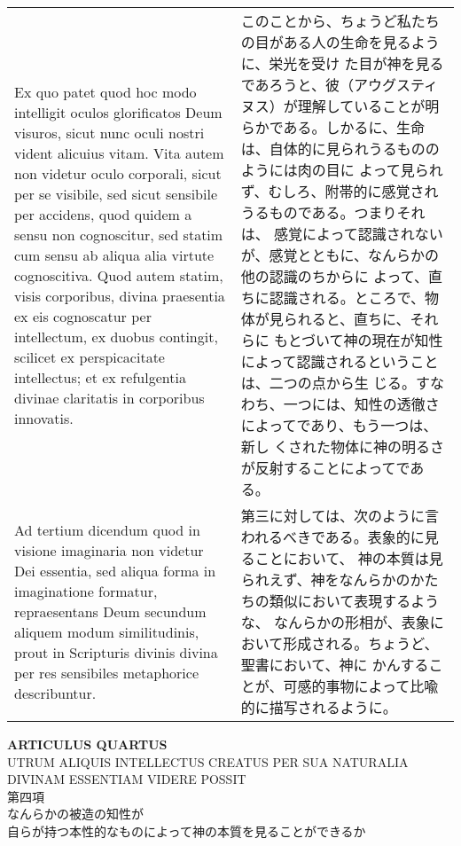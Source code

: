 \documentclass[10pt]{jsarticle} %
\begin{document}
\begin{longtable}{p{21em}p{21em}}
\\

Ex quo patet quod hoc modo intelligit oculos glorificatos Deum
visuros, sicut nunc oculi nostri vident alicuius vitam. Vita autem non
videtur oculo corporali, sicut per se visibile, sed sicut sensibile
per accidens, quod quidem a sensu non cognoscitur, sed statim cum
sensu ab aliqua alia virtute cognoscitiva. Quod autem statim, visis
corporibus, divina praesentia ex eis cognoscatur per intellectum, ex
duobus contingit, scilicet ex perspicacitate intellectus; et ex
refulgentia divinae claritatis in corporibus innovatis.

&

このことから、ちょうど私たちの目がある人の生命を見るように、栄光を受け
た目が神を見るであろうと、彼（アウグスティヌス）が理解していることが明
らかである。しかるに、生命は、自体的に見られうるもののようには肉の目に
よって見られず、むしろ、附帯的に感覚されうるものである。つまりそれは、
感覚によって認識されないが、感覚とともに、なんらかの他の認識のちからに
よって、直ちに認識される。ところで、物体が見られると、直ちに、それらに
もとづいて神の現在が知性によって認識されるということは、二つの点から生
じる。すなわち、一つには、知性の透徹さによってであり、もう一つは、新し
くされた物体に神の明るさが反射することによってである。

\\

{\sc Ad tertium dicendum} quod in visione imaginaria non videtur Dei
essentia, sed aliqua forma in imaginatione formatur, repraesentans
Deum secundum aliquem modum similitudinis, prout in Scripturis divinis
divina per res sensibiles metaphorice describuntur.

&

第三に対しては、次のように言われるべきである。表象的に見ることにおいて、
神の本質は見られえず、神をなんらかのかたちの類似において表現するような、
なんらかの形相が、表象において形成される。ちょうど、聖書において、神に
かんすることが、可感的事物によって比喩的に描写されるように。

\end{longtable}

\newpage
{}

 \begin{center}
  {\Large {\bf ARTICULUS QUARTUS}}\\
{\large UTRUM ALIQUIS INTELLECTUS CREATUS PER SUA NATURALIA\\
DIVINAM ESSENTIAM VIDERE POSSIT}\\
{\large 第四項\\なんらかの被造の知性が\\自らが持つ本性的なものによって神の本質を見ることができるか}
 \end{center}
\end{document}
